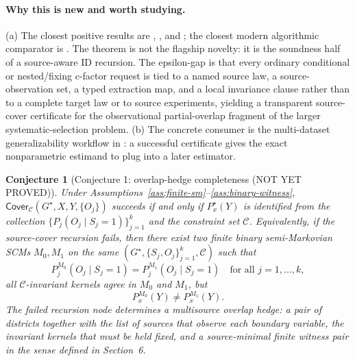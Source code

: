 \documentclass[11pt]{article}
\theoremstyle{definition}
\theoremstyle{plain}
\newtheorem{conjecture}{Conjecture}
\theoremstyle{remark}
\begin{document}
\paragraph{Why this is new and worth studying.}
(a) The closest positive results are
\citet{BareinboimPearl2012TransportCompleteness},
\citet{BareinboimPearl2014MZTransport}, and
\citet{BareinboimTianPearl2014Selection}; the closest modern algorithmic
comparator is \citet{LeeGhassamiShpitser2024DataFusionSelection}.  The theorem
is not the flagship novelty: it is the soundness half of a source-aware ID
recursion.  The epsilon-gap is that every ordinary conditional or nested/fixing
c-factor request is tied to a named source law, a source-observation set, a
typed extraction map, and a local invariance clause
rather than to a complete target law or to source experiments, yielding a
transparent source-cover certificate for the observational partial-overlap
fragment of the larger systematic-selection problem.  (b) The concrete consumer is
the multi-dataset generalizability workflow in
\citet{ColnetEtAl2024RCTObservationalReview}: a successful certificate gives
the exact nonparametric estimand to plug into a later estimator.

\begin{conjecture}[Conjecture 1: overlap-hedge completeness (NOT YET PROVED)]\label{conj:overlap-hedge-completeness}
Under Assumptions~\ref{ass:finite-sm}--\ref{ass:binary-witness},
\(\mathsf{Cover}_{\mathcal C}(G^\star,X,Y,\{O_j\})\) succeeds if and only if
\(P^\star_x(Y)\) is identified from the collection
\(\{P_j(O_j\mid S_j=1)\}_{j=1}^k\) and the constraint set \(\mathcal C\).
Equivalently, if the source-cover recursion fails, then there exist two
finite binary semi-Markovian SCMs \(M_0,M_1\) on the same
\((G^\star,\{S_j,O_j\}_{j=1}^k,\mathcal C)\) such that
\[
  P^{M_0}_j(O_j\mid S_j=1)=P^{M_1}_j(O_j\mid S_j=1)
  \quad\text{for all }j=1,\ldots,k,
\]
all \(\mathcal C\)-invariant kernels agree in \(M_0\) and \(M_1\), but
\[
  P^{M_0}_x(Y)\ne P^{M_1}_x(Y).
\]
The failed recursion node determines a multisource overlap hedge: a pair of
districts together with the list of sources that observe each boundary
variable, the invariant kernels that must be held fixed, and a source-minimal
finite witness pair in the sense defined in Section~6.
\end{conjecture}
\end{document}
